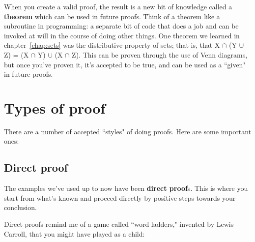 When you create a valid proof, the result is a new bit of knowledge called
a \textbf{theorem} which can be used in future proofs. Think of a theorem
like a subroutine in programming: a separate bit of code that does a job and
can be invoked at will in the course of doing other things. One theorem we
learned in chapter~\ref{chap:sets} was the distributive property of sets;
that is, that X $\cap$ (Y $\cup$ Z) = (X $\cap$ Y) $\cup$ (X $\cap$ Z).
This can be proven through the use of Venn diagrams, but once you've proven
it, it's accepted to be true, and can be used as a ``given" in future
proofs.

\section{Types of proof}

There are a number of accepted ``styles" of doing proofs. Here are some
important ones:

\subsection{Direct proof}

The examples we've used up to now have been \textbf{direct proof}s. This is
where you start from what's known and proceed directly by positive steps
towards your conclusion.

Direct proofs remind me of a game called ``word ladders," invented by Lewis
Carroll, that you might have played as a child:

